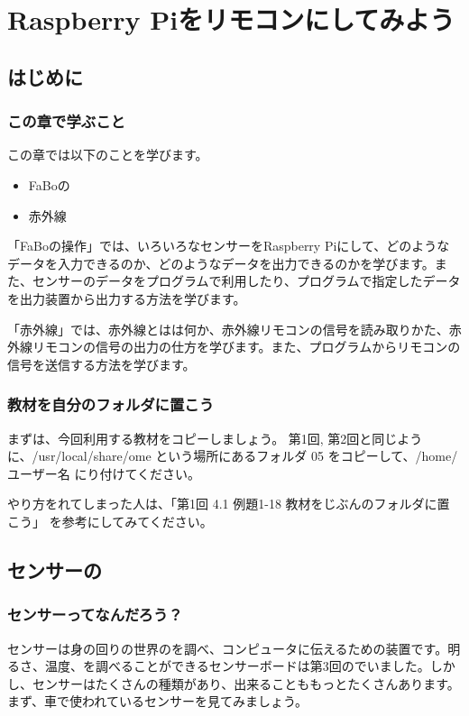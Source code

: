 \chapter{Raspberry Piをリモコンにしてみよう}
\section{はじめに}
\subsection{この章で学ぶこと}

この章では以下のことを学びます。
\begin{itemize}
\item FaBoの
\item 赤外線
\end{itemize}

「FaBoの操作」では、いろいろなセンサーをRaspberry Piにして、どのようなデータを入力できるのか、どのようなデータを出力できるのかを学びます。また、センサーのデータをプログラムで利用したり、プログラムで指定したデータを出力装置から出力する方法を学びます。

「赤外線」では、赤外線とはは何か、赤外線リモコンの信号を読み取りかた、赤外線リモコンの信号の出力の仕方を学びます。また、プログラムからリモコンの信号を送信する方法を学びます。

\subsection{教材を自分のフォルダに置こう}
まずは、今回利用する教材をコピーしましょう。
第1回, 第2回と同じように、\nobreak/usr/local/share/ome という場所にあるフォルダ 05 をコピーして、/home/ユーザー名 にり付けてください。

やり方をれてしまった人は、「第1回 4.1 例題1-18 教材をじぶんのフォルダに置こう」 を参考にしてみてください。


\section{センサーの}
\subsection{センサーってなんだろう？}
センサーは身の回りの世界のを調べ、コンピュータに伝えるための装置です。明るさ、温度、を調べることができるセンサーボードは第3回のでいました。しかし、センサーはたくさんの種類があり、出来ることももっとたくさんあります。まず、車で使われているセンサーを見てみましょう。

